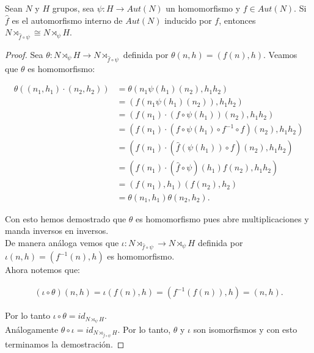 Sean $N$ y $H$ grupos, sea $\psi : H \rightarrow Aut(N)$ un homomorfismo y $f \in Aut(N)$. 
Si $\hat{f}$ es el automorfismo interno de $Aut(N)$ inducido por $f$, entonces
$N \rtimes_{\hat{f} \circ \psi} \cong N \rtimes_\psi H$.\\

\begin{proof}
    Sea $\theta : N \rtimes_\psi H \rightarrow N \rtimes_{\hat{f} \circ \psi}$ definida por
    $\theta(n,h) = (f(n), h)$. Veamos que $\theta$ es homomorfismo:
    
    \begin{align}
        \theta((n_1, h_1)\cdot(n_2, h_2))&= \theta(n_1 \psi(h_1)(n_2), h_1 h_2) \\
                                         &= (f(n_1 \psi(h_1)(n_2)), h_1 h_2)  \\
                                         &= (f(n_1) \cdot (f\circ\psi(h_1))(n_2), h_1 h_2) \\
                                         &= (f(n_1) \cdot (f \circ \psi(h_1) \circ f^{-1} \circ f) (n_2), h_1 h_2) \\
                                         &= (f(n_1) \cdot (\hat{f}(\psi(h_1)) \circ f) (n_2), h_1 h_2) \\
                                         &= (f(n_1) \cdot (\hat{f} \circ \psi)(h_1) f(n_2), h_1 h_2) \\
                                         &= (f(n_1), h_1) (f(n_2), h_2)\\
                                         &= \theta(n_1, h_1) \theta(n_2, h_2).
    \end{align}
    
    Con esto hemos demostrado que $\theta$ es homomorfismo pues abre multiplicaciones y manda inversos en 				inversos.\\
    
    De manera análoga vemos que $\iota : N \rtimes_{\hat{f} \circ \psi} \rightarrow N \rtimes_\psi H $ 
    definida por $\iota(n,h) = (f^{-1}(n), h)$ es homomorfismo.\\
    
    Ahora notemos que:
    
    \begin{align}
        (\iota \circ \theta) (n, h) = \iota(f(n), h) = (f^{-1}(f(n)), h) = (n,h).
    \end{align}		
    
    Por lo tanto $\iota \circ \theta = id_{N \rtimes_\psi H}$.\\
    
    An\'alogamente $\theta \circ \iota = id_{N \rtimes_{\hat{f} \circ \psi} H}$. Por lo tanto, $\theta$ y 
    $\iota$ son isomorfismos y con esto terminamos la demostración.
\end{proof}